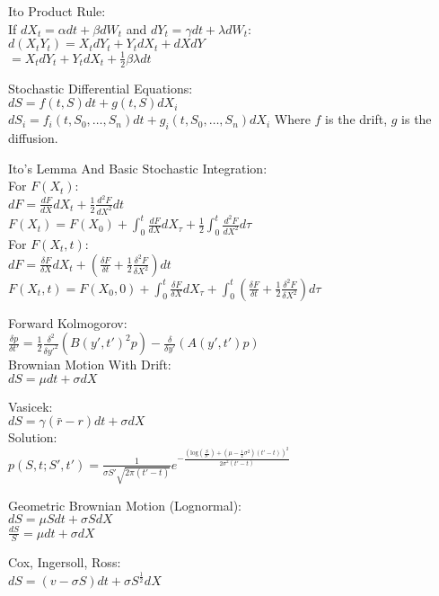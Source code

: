 Ito Product Rule: \\
If $dX_t=\alpha dt+\beta dW_t$ and $dY_t=\gamma dt + \lambda dW_t$: \\
$d(X_t Y_t)=X_t dY_t + Y_t dX_t + dXdY$ \\
$=X_t dY_t + Y_t dX_t + \frac{1}{2} \beta \lambda dt$

Stochastic Differential Equations: \\
$dS=f(t,S)dt+g(t,S)dX_i$ \\
$dS_i=f_i(t,S_0,\dots,S_n)dt+g_i(t,S_0,\dots,S_n)dX_i$
Where $f$ is the drift, $g$ is the diffusion.

Ito's Lemma And Basic Stochastic Integration: \\
For $F(X_t)$: \\
$dF = \frac{dF}{dX}dX_t + \frac{1}{2} \frac{d^2F}{dX^2}dt$ \\
$F(X_t)=F(X_0)+\int_{0}^{t} \frac{dF}{dX} dX_{\tau}+\frac{1}{2}\int_0^{t} \frac{d^2F}{dX^2} d\tau$ \\
For $F(X_t,t)$: \\
$dF=\frac{\delta F}{\delta X} dX_t + \left(\frac{\delta F}{\delta t}+\frac{1}{2} \frac{\delta^2 F}{\delta X^2} \right) dt$ \\
$F(X_t,t)=F(X_0,0)+\int_{0}^t \frac{\delta F}{\delta X}dX_{\tau} + \int_{0}^t \left( \frac{\delta F}{\delta t}+\frac{1}{2} \frac{\delta^2 F}{\delta X^2} \right) d\tau$

Forward Kolmogorov: \\
$\frac{\delta p}{\delta t'} = \frac{1}{2} \frac{\delta^2}{\delta y'^2} (B(y',t')^2 p) - \frac{\delta}{\delta y'} (A(y',t') p)$ \\

Brownian Motion With Drift: \\
$dS=\mu dt+\sigma dX$

Vasicek: \\
$dS=\gamma (\bar{r}-r)dt+\sigma dX$ \\
Solution: \\
$p(S,t;S',t')=\frac{1}{\sigma S' \sqrt{2\pi(t'-t)}} e^{-\frac{(\text{log} \left( \frac{S}{S'} \right)+(\mu - \frac{1}{2} \sigma^2)(t'-t) )^2}{2 \sigma^2 (t'-t)}}$

Geometric Brownian Motion (Lognormal): \\
$dS=\mu S dt+\sigma S dX$ \\
$\frac{dS}{S} = \mu dt + \sigma dX$

Cox, Ingersoll, Ross: \\
$dS=(v-\sigma S)dt+\sigma S^{\frac{1}{2}} dX$

